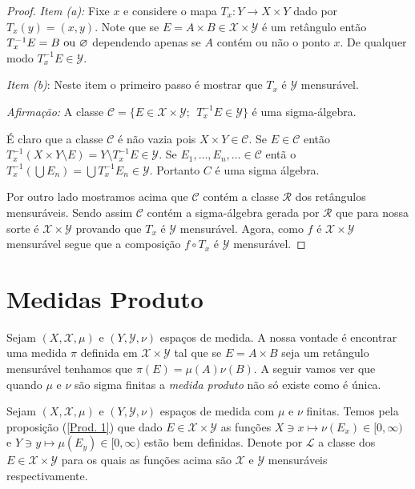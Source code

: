 \begin{proof}
 \emph{Item (a):} Fixe $x$ e considere o mapa $T_x:Y\to X\times Y$ dado por $T_x(y)=(x,y)$.
 Note que se $E=A\times B\in \mathscr{X}\times \mathscr{Y}$
é um retângulo então $T_{x}^{-1}E=B~\textnormal{ou}~\varnothing$ 
dependendo apenas se 
$A$ contém ou não o ponto $x$.  De qualquer modo $T_x^{-1}E\in \mathscr{Y}$.
\medskip

\noindent \emph{Item (b)}:  Neste item o primeiro passo é  mostrar 
que $T_x$ é $\mathscr{Y}$ 
mensurável. 
\medskip

\noindent \emph{Afirmação:} A classe
 $\mathcal{C}=\{E\in \mathscr{X}\times \mathscr{Y};~~T_x^{-1}E\in \mathscr{Y} \}$ 
 é uma sigma-álgebra.
\medskip 
 
\noindent É claro que a classe  $\mathcal{C}$ é
 não vazia pois $X\times Y\in \mathcal{C}$. 
 Se $E\in \mathcal{C}$ então 
$T_x^{-1}(X\times Y\setminus E)=Y\setminus T_x^{-1}E\in \mathscr{Y}.$  
Se $E_1, \ldots, E_n, \ldots \in \mathcal{C}$ entã
o $T_x^{-1}(\bigcup E_n)=\bigcup T_x^{-1}E_n\in \mathscr{Y}$. Portanto 
$C$ é uma sigma álgebra.
\medskip

Por outro lado mostramos acima que $\mathcal{C}$ contém a
 classe $\mathscr{R}$ dos retângulos mensuráveis. Sendo assim $\mathcal{C}$ contém a 
 sigma-álgebra gerada por $\mathscr{R}$ que para nossa sorte é $\mathscr{X}\times \mathscr{Y}$ 
 provando que $T_x$ é $\mathscr{Y}$ 
mensurável.  Agora, como $f$ é $\mathscr{X}\times \mathscr{Y}$ mensurável 
 segue que a composição $f\circ T_x$ é $\mathscr{Y}$ mensurável.

\end{proof}


\section{Medidas Produto}
Sejam $(X, \mathscr{X}, \mu)$ e $(Y, \mathscr{Y}, \nu)$
 espaços de medida. A nossa  vontade é encontrar uma medida $\pi$ definida 
 em $\mathscr{X}\times \mathscr{Y}$ tal que se $E=A\times B$ seja um retângulo mensurável 
 tenhamos que $\pi(E)=\mu(A)\nu(B)$. A seguir vamos ver que quando 
 $ \mu$ e $\nu$ são sigma finitas a \emph{medida produto} não só existe como é única.
 \medskip
 

Sejam $(X, \mathscr{X}, \mu)$ e $(Y, \mathscr{Y}, \nu)$
 espaços de medida com $\mu$ e $\nu$ finitas. 
 Temos pela proposição (\ref{Prod. 1}) que dado
  $E\in \mathscr{X}\times \mathscr{Y}$ as funções 
  $X\ni x\mapsto \nu(E_x)\in [0, \infty)$ e
   $Y\ni y\mapsto \mu(E_y)\in [0, \infty)$ estão bem definidas.
Denote por $\mathscr{L}$ a classe dos $E\in \mathscr{X}\times \mathscr{Y}$
para os quais as funções acima são $\mathscr{X}$ e $\mathscr{Y}$ mensuráveis 
respectivamente.

